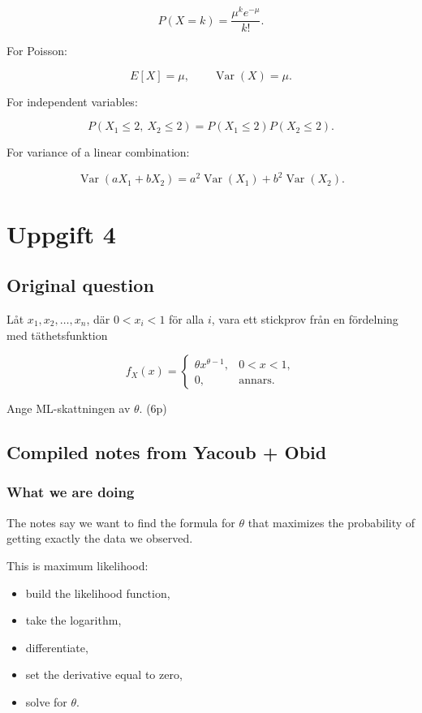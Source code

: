 \documentclass[10pt]{article}
\begin{document}
\[
P(X=k)=
\frac{\mu^k e^{-\mu}}{k!}.
\]

For Poisson:

\[
E[X]=\mu,
\qquad
\operatorname{Var}(X)=\mu.
\]

For independent variables:

\[
P(X_1\leq 2,\ X_2\leq 2)
=
P(X_1\leq 2)P(X_2\leq 2).
\]

For variance of a linear combination:

\[
\operatorname{Var}(aX_1+bX_2)
=
a^2\operatorname{Var}(X_1)
+b^2\operatorname{Var}(X_2).
\]

\section*{Uppgift 4}

\subsection*{Original question}
Låt $x_1,x_2,\ldots,x_n$, där $0<x_i<1$ för alla $i$, vara ett
stickprov från en fördelning med täthetsfunktion

\[
f_X(x)=
\begin{cases}
\theta x^{\theta-1},
& 0<x<1,\\
0,
& \text{annars.}
\end{cases}
\]

Ange ML-skattningen av $\theta$.
\hfill (6p)

\subsection*{Compiled notes from Yacoub + Obid}

\subsubsection*{What we are doing}
The notes say we want to find the formula for $\theta$ that maximizes
the probability of getting exactly the data we observed.

This is maximum likelihood:

\begin{itemize}
\item build the likelihood function,
\item take the logarithm,
\item differentiate,
\item set the derivative equal to zero,
\item solve for $\theta$.
\end{itemize}
\end{document}
